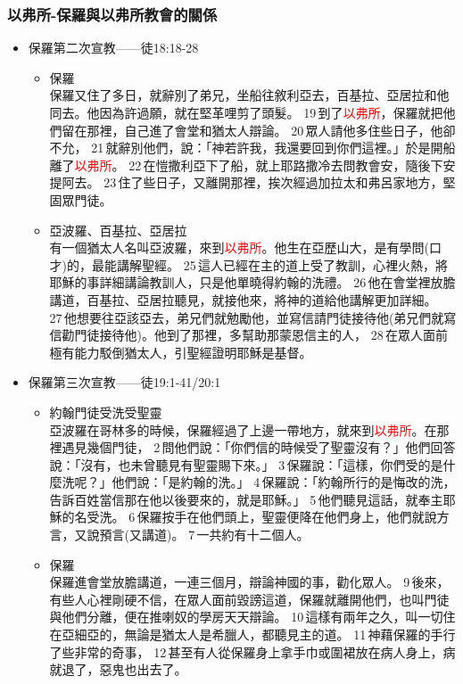 \subsubsection{以弗所-保羅與以弗所教會的關係}
\begin{itemize}
\itemsep-.25em 
\item 保羅第二次宣教——徒18:18-28
\begin{itemize}
\itemsep-.25em 
\item 保羅\\
保羅又住了多日，就辭別了弟兄，坐船往敘利亞去，百基拉、亞居拉和他同去。他因為許過願，就在堅革哩剪了頭髮。 19 到了\textcolor{red}{以弗所}，保羅就把他們留在那裡，自己進了會堂和猶太人辯論。 20 眾人請他多住些日子，他卻不允， 21 就辭別他們，說：「神若許我，我還要回到你們這裡。」於是開船離了\textcolor{red}{以弗所}。 22 在愷撒利亞下了船，就上耶路撒冷去問教會安，隨後下安提阿去。 23 住了些日子，又離開那裡，挨次經過加拉太和弗呂家地方，堅固眾門徒。
\item 亞波羅、百基拉、亞居拉\\
有一個猶太人名叫亞波羅，來到\textcolor{red}{以弗所}。他生在亞歷山大，是有學問(口才)的，最能講解聖經。 25 這人已經在主的道上受了教訓，心裡火熱，將耶穌的事詳細講論教訓人，只是他單曉得約翰的洗禮。 26 他在會堂裡放膽講道，百基拉、亞居拉聽見，就接他來，將神的道給他講解更加詳細。 27 他想要往亞該亞去，弟兄們就勉勵他，並寫信請門徒接待他(弟兄們就寫信勸門徒接待他)。他到了那裡，多幫助那蒙恩信主的人， 28 在眾人面前極有能力駁倒猶太人，引聖經證明耶穌是基督。
\end{itemize}
\item 保羅第三次宣教——徒19:1-41/20:1
\begin{itemize}
\itemsep-.25em 
\item 約翰門徒受洗受聖靈\\
亞波羅在哥林多的時候，保羅經過了上邊一帶地方，就來到\textcolor{red}{以弗所}。在那裡遇見幾個門徒， 2 問他們說：「你們信的時候受了聖靈沒有？」他們回答說：「沒有，也未曾聽見有聖靈賜下來。」 3 保羅說：「這樣，你們受的是什麼洗呢？」他們說：「是約翰的洗。」 4 保羅說：「約翰所行的是悔改的洗，告訴百姓當信那在他以後要來的，就是耶穌。」 5 他們聽見這話，就奉主耶穌的名受洗。 6 保羅按手在他們頭上，聖靈便降在他們身上，他們就說方言，又說預言(又講道)。 7 一共約有十二個人。
\item 保羅\\
保羅進會堂放膽講道，一連三個月，辯論神國的事，勸化眾人。 9 後來，有些人心裡剛硬不信，在眾人面前毀謗這道，保羅就離開他們，也叫門徒與他們分離，便在推喇奴的學房天天辯論。 10 這樣有兩年之久，叫一切住在亞細亞的，無論是猶太人是希臘人，都聽見主的道。 11 神藉保羅的手行了些非常的奇事， 12 甚至有人從保羅身上拿手巾或圍裙放在病人身上，病就退了，惡鬼也出去了。

\end{itemize}
\end{itemize}

